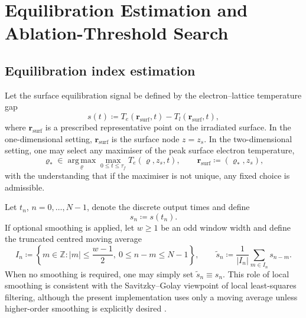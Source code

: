 \chapter{Equilibration Estimation and Ablation-Threshold Search}
\label{app:equilibration-ablation}

\section{Equilibration index estimation}
\label{app:equilibration}

Let the surface equilibration signal be defined by the electron--lattice
temperature gap
\begin{equation}
    s(t) \coloneqq T_e(\mathbf{r}_{\mathrm{surf}}, t) - T_l(\mathbf{r}_{\mathrm{surf}}, t),
    \label{eq:app-signal}
\end{equation}
where \(\mathbf{r}_{\mathrm{surf}}\) is a prescribed representative point on the irradiated surface.
In the one-dimensional setting, \(\mathbf{r}_{\mathrm{surf}}\) is the surface node \(z=z_s\).
In the two-dimensional setting, one may select any maximiser of the peak surface electron temperature,
\begin{equation}
    \varrho_* \in \operatorname*{arg\,max}_{\varrho}
    \max_{0 \le t \le \tau_f} T_e(\varrho,z_s,t),
    \qquad
    \mathbf{r}_{\mathrm{surf}} \coloneqq (\varrho_*,z_s),
    \label{eq:app-surface-argmax}
\end{equation}
with the understanding that if the maximiser is not unique, any fixed choice is admissible.

Let \(t_n\), \(n=0,\dots,N-1\), denote the discrete output times and define
\begin{equation}
    s_n \coloneqq s(t_n).
\end{equation}
If optional smoothing is applied, let \(w\ge 1\) be an odd window width and define the truncated centred moving average
\begin{equation}
    I_n \coloneqq
    \left\{
    m\in\mathbb{Z} :
    |m|\le \frac{w-1}{2},
    \ 0\le n-m \le N-1
    \right\},
    \qquad
    \tilde s_n \coloneqq \frac{1}{|I_n|}\sum_{m\in I_n} s_{n-m}.
    \label{eq:app-smoothed-series}
\end{equation}
When no smoothing is required, one may simply set \(\tilde s_n \equiv s_n\).
This role of local smoothing is consistent with the Savitzky--Golay viewpoint of local least-squares filtering, although the present implementation uses only a moving average unless higher-order smoothing is explicitly desired \cite{Savitzky_1964}.

